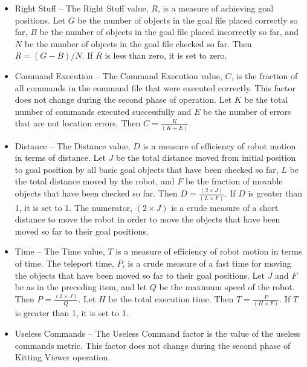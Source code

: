     \begin{itemize}
\item \small \sf Right Stuff \rm \normalsize -- The Right Stuff value, $R$,
  is a measure of achieving goal positions. Let $G$ be the number of
  objects in the goal file placed correctly so far, $B$ be the number of
  objects in the goal file placed incorrectly so far, and $N$ be the number
  of objects in the goal file checked so far. Then $R = (G - B) / N$. If
  $R$ is less than zero, it is set to zero.

\item \small \sf Command Execution \rm \normalsize -- The Command Execution
  value, $C$, is the fraction of all commands in the command file that were
  executed correctly. This factor does not change during the second phase
  of operation. Let $K$ be the total number of commands
  executed successfully and $E$ be the number of errors that are not
  location errors. Then $C = \frac{K}{(K + E)} $.

\item \small \sf Distance \rm \normalsize -- The Distance value, $D$ is a
  measure of efficiency of robot motion in terms of distance. Let $J$ be
  the total distance moved from initial position to goal position by all
  basic goal objects that have been checked so far, $L$ be the total
  distance moved by the robot, and $F$ be the fraction of movable objects
  that have been checked so far. Then $D = \frac{(2 \times J)}{(L \times F)} $. If
  $D$ is greater than 1, it is set to 1. The numerator, $(2 \times J)$ is a
  crude measure of a short distance to move the robot in order to move the
  objects that have been moved so far to their goal positions.

\item \small \sf Time \rm \normalsize -- The Time value, $T$ is a measure
  of efficiency of robot motion in terms of time. The teleport time, $P$,
  is a crude measure of a fast time for moving the objects that have been
  moved so far to their goal positions. Let $J$ and $F$ be as in the
  preceding item, and let $Q$ be the maximum speed of the robot. Then
  $P = \frac{(2 \times J)}{Q}$. Let $H$ be the total execution time.
  Then $T =\frac{P}{(H \times F)}$. If $T$ is greater than 1, it is set to 1.

\item \small \sf Useless Commands \rm \normalsize -- The Useless Command
  factor is the value of the useless commands metric. This factor does not
  change during the second phase of Kitting Viewer operation.
    \end{itemize}

